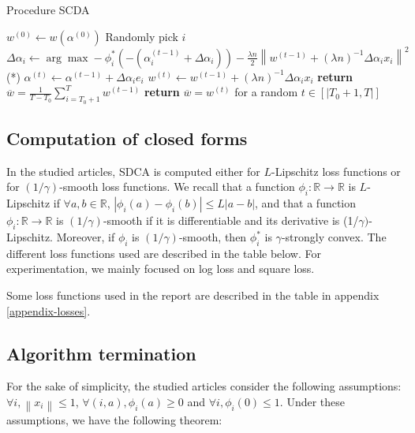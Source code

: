 \documentclass{article}
\newcommand{\abs}[1]{\left|#1\right|}
\newcommand{\norm}[1]{\left\|#1 \right\|}
\begin{document}
\begin{algorithm}[H]
    \caption{Procedure SCDA}
    \begin{algorithmic}
        \State $w^{(0)} \gets w(\alpha^{(0)})$
        \State Randomly pick $i$
        \State $\Delta \alpha_i \gets \arg \max -\phi^{*}_i(-(\alpha_i^{(t-1)}+\Delta \alpha_i))-\frac{\lambda n}{2}\norm{w^{(t-1)}+(\lambda n)^{-1}\Delta \alpha_i x_i}^2$ \qquad \qquad \qquad \qquad \qquad (*)
        \State $\alpha^{(t)} \gets \alpha^{(t-1)} + \Delta \alpha_i e_i$
        \State $w^{(t)} \gets w^{(t-1)} + (\lambda n)^{-1} \Delta \alpha_i x_i$
        \EndFor
        \State \textbf{return} $\overline{w} = \frac{1}{T-T_0} \sum_{i = T_0+1}^T w^{(t-1)}$
        \EndIf
        \State \textbf{return} $\overline{w} = w^{(t)}$ for a random $t \in [|T_0+1, T|]$
        \EndIf
        \EndProcedure
    \end{algorithmic}
\end{algorithm}


\subsection{Computation of closed forms}

In the studied articles, SDCA is computed either for $L$-Lipschitz loss functions or for $(1/\gamma)$-smooth loss functions.
We recall that a function $\phi_i : \mathbb{R} \rightarrow \mathbb{R}$ is $L$-Lipschitz if $\forall a,b \in \mathbb{R}$, $\abs{\phi_i(a)-\phi_i(b)} \leq L \abs{a-b}$, and that a function $\phi_i : \mathbb{R} \rightarrow \mathbb{R}$ is $(1/\gamma)$-smooth if it is differentiable and its derivative is (1/$\gamma)$-Lipschitz.
Moreover, if $\phi_i$ is $(1/\gamma)$-smooth, then $\phi_i^{*}$ is $\gamma$-strongly convex.
The different loss functions used are described in the table below.
For experimentation, we mainly focused on log loss and square loss.

Some loss functions used in the report are described in the table in appendix \ref{appendix-losses}.

\subsection{Algorithm termination}

For the sake of simplicity, the studied articles consider the following assumptions: $\forall i, \norm{x_i} \leq 1$, $\forall (i,a), \phi_i(a) \geq 0$ and $\forall i, \phi_i(0) \leq 1$.
Under these assumptions, we have the following theorem:
\end{document}
